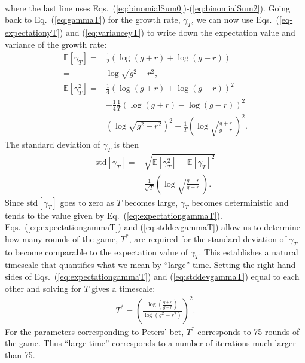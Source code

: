 \documentclass[11pt]{article}
\begin{document}
\begin{multicols}{2}
\begin{align}
\end{align}
where the last line uses Eqs.~(\ref{eq:binomialSum0})-(\ref{eq:binomialSum2}).
Going back to Eq.~(\ref{eq:gammaT}) for the growth rate, $\gamma_T$, we can now use Eqs.~(\ref{eq-expectationyT}) and (\ref{eq:varianceyT}) to write down the expectation value and variance of the growth rate:
\begin{align}
\nonumber \mathbb{E}\left[ \gamma_T \right] = & \frac{1}{2} \left(\log (g+r) + \log (g-r)\right)\\
\label{eq:expectationgammaT} =& \log \sqrt{g^2 - r^2},\\
\nonumber \mathbb{E}\left[ \gamma_T^2 \right] = &  \frac{1}{4}  \left(\log (g+r) + \log (g-r)\right)^2\\
\nonumber & + \frac{1}{4}\frac{1}{T} \left(\log (g+r) - \log (g-r)\right)^2\\
\label{eq:variancegammaT} =&  \left(\log \sqrt{g^2 - r^2}\right)^2 + \frac{1}{T} \left( \log \sqrt{\frac{g+r}{g-r}}\,\right)^2.
\end{align}
The standard deviation of $\gamma_T$ is then
\begin{align}
\nonumber  \text{std}\left[ \gamma_T\right] = & \sqrt{ \mathbb{E}\left[\gamma_T^2 \right]  -  \mathbb{E}\left[\gamma_T \right]^2 }\\
\label{eq:stddevgammaT} = &  \frac{1}{\sqrt{T}} \left( \log \sqrt{\frac{g+r}{g-r}}\,\right).
\end{align}
Since $\text{std}\left[ \gamma_T\right]$ goes to zero as $T$ becomes large,  $\gamma_T$ becomes deterministic and tends to the value given by Eq.~(\ref{eq:expectationgammaT}).
Eqs.~(\ref{eq:expectationgammaT}) and (\ref{eq:stddevgammaT}) allow us to determine how many rounds of the game, $T^*$, are required for the standard deviation of $\gamma_T$ to become comparable to the expectation value of $\gamma_T$. This establishes a natural timescale that quantifies what we mean by ``large'' time.  Setting the right hand sides of Eqs.~(\ref{eq:expectationgammaT}) and (\ref{eq:stddevgammaT}) equal to each other and solving for $T$ gives a timescale:
\begin{align}
T^* = \left( \frac{\log\left(\frac{g+r}{g-r}\right)}{ \log\left(g^2 - r^2 \right)}\right)^2.
\end{align}
For the parameters corresponding to Peters' bet, $T^*$ corresponds to 75 rounds of the game. Thus ``large time'' corresponds to a number of iterations much larger than 75.


\end{multicols}
\end{document}
